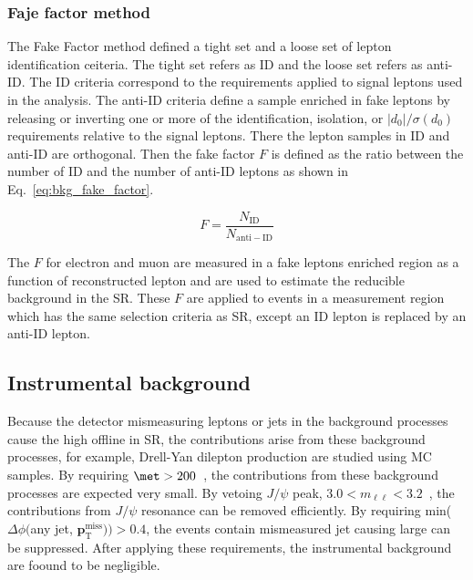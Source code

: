 \subsubsection{Faje factor method}
\label{subsubsec:bkg_fake_factor_method}
The Fake Factor method defined a tight set and a loose set of lepton identification ceiteria.
The tight set refers as ID and the loose set refers as anti-ID.
The ID criteria correspond to the requirements applied to signal leptons used in the analysis.
The anti-ID criteria define a sample enriched in fake leptons by releasing or inverting one or more of the identification, isolation, or $|d_{0}|/\sigma(d_{0})$ requirements relative to the signal leptons.
There the lepton samples in ID and anti-ID are orthogonal.
Then the fake factor $F$ is defined as the ratio between the number of ID and the number of anti-ID leptons as shown in Eq.~\ref{eq:bkg_fake_factor}.

\begin{equation}
    F = \frac{N_\mathrm{ID}}{N_\mathrm{anti-ID}}
    \label{eq:bkg_fake_factor}
\end{equation}

The $F$ for electron and muon are measured in a fake leptons enriched region as a function of reconstructed lepton \pt and are used to estimate the reducible background in the SR.
These $F$ are applied to events in a measurement region which has the same selection criteria as SR, except an ID lepton is replaced by an anti-ID lepton.







\subsection{Instrumental \met background}
\label{subsec:bkg_instrumental_met_background}
Because the detector mismeasuring leptons or jets in the background processes cause the high offline \met in SR, the contributions arise from these background processes, for example, Drell-Yan dilepton production are studied using MC samples.
By requiring $\met > 200$~{\GeV}, the contributions from these background processes are expected very small.
By vetoing $J/\psi$ peak, $3.0 < m_{\ell \ell} < 3.2$~{\GeV}, the contributions from $J/\psi$ resonance can be removed efficiently.
By requiring min($\Delta \phi($any jet, $\mathbf{p}^{\mathrm{miss}}_{\mathrm{T}})) > 0.4$, the events contain mismeasured jet causing large \met can be suppressed.
After applying these requirements, the instrumental \met background are foound to be negligible.

